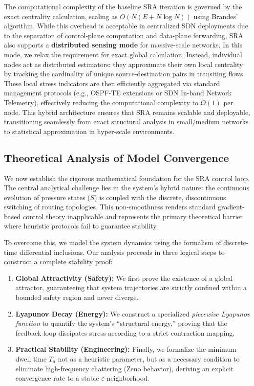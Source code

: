 \documentclass{ccjnl}
\begin{document}
The computational complexity of the baseline SRA iteration is governed by the exact centrality calculation, scaling as $O(N(E + N \log N))$ using Brandes' algorithm. 
While this overhead is acceptable in centralized SDN deployments due to the separation of control-plane computation and data-plane forwarding, SRA also supports a \textbf{distributed sensing mode} for massive-scale networks.
In this mode, we relax the requirement for exact global calculation. 
Instead, individual nodes act as distributed estimators: they approximate their own local centrality by tracking the cardinality of unique source-destination pairs in transiting flows. 
These local stress indicators are then efficiently aggregated via standard management protocols (e.g., OSPF-TE extensions or SDN In-band Network Telemetry), effectively reducing the computational complexity to $O(1)$ per node.
This hybrid architecture ensures that SRA remains scalable and deployable, transitioning seamlessly from exact structural analysis in small/medium networks to statistical approximation in hyper-scale environments.


\subsection{Theoretical Analysis of Model Convergence}
\label{sec:convergence_analysis}

We now establish the rigorous mathematical foundation for the SRA control loop. 
The central analytical challenge lies in the system's hybrid nature: the continuous evolution of pressure states ($S$) is coupled with the discrete, discontinuous switching of routing topologies. 
This non-smoothness renders standard gradient-based control theory inapplicable and represents the primary theoretical barrier where heuristic protocols fail to guarantee stability.

To overcome this, we model the system dynamics using the formalism of discrete-time differential inclusions. 
Our analysis proceeds in three logical steps to construct a complete stability proof:
\begin{enumerate}
    \item \textbf{Global Attractivity (Safety):} We first prove the existence of a global attractor, guaranteeing that system trajectories are strictly confined within a bounded safety region and never diverge.
    \item \textbf{Lyapunov Decay (Energy):} We construct a specialized \textit{piecewise Lyapunov function} to quantify the system's ``structural energy,'' proving that the feedback loop dissipates stress according to a strict contraction mapping.
    \item \textbf{Practical Stability (Engineering):} Finally, we formalize the minimum dwell time $T_d$ not as a heuristic parameter, but as a necessary condition to eliminate high-frequency chattering (Zeno behavior), deriving an explicit convergence rate to a stable $\varepsilon$-neighborhood.
\end{enumerate}
\end{document}
